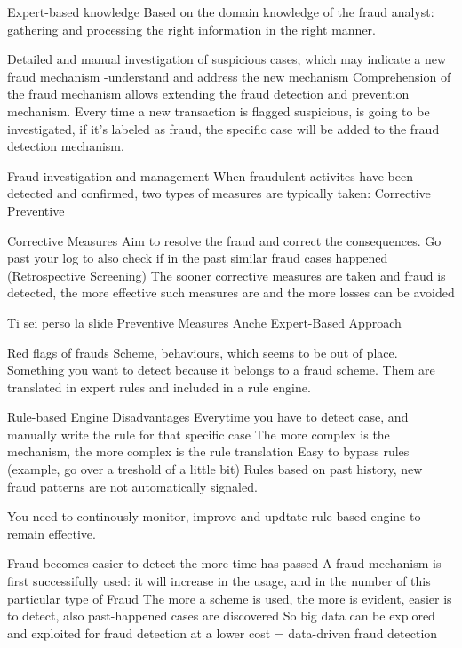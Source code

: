 Expert-based knowledge
    Based on the domain knowledge of the fraud analyst: gathering and processing the right information in the right manner.
    
    Detailed and manual investigation of suspicious cases, which may indicate a new fraud mechanism
        -understand and address the new mechanism 
    Comprehension of the fraud mechanism allows extending the fraud detection and prevention mechanism. Every time a new transaction is flagged suspicious, is going to be investigated, if it's labeled as fraud, the specific case will be added to the fraud detection mechanism.


Fraud investigation and management
    When fraudulent activites have been detected and confirmed, two types of measures are typically taken:
        Corrective 
        Preventive 

    Corrective Measures 
        Aim to resolve the fraud and correct the consequences. Go past your log to also check if in the past similar fraud cases happened (Retrospective Screening)
        The sooner corrective measures are taken and fraud is detected, the more effective such measures are and the more losses can be avoided

    Ti sei perso la slide Preventive Measures 
Anche Expert-Based Approach

Red flags of frauds
        Scheme, behaviours, which seems to be out of place. Something you want to detect because it belongs to a fraud scheme.
        Them are translated in expert rules and included in a rule engine.
    
Rule-based Engine Disadvantages 
        Everytime you have to detect case, and manually write the rule for that specific case
        The more complex is the mechanism, the more complex is the rule translation 
        Easy to bypass rules (example, go over a treshold of a little bit)
        Rules based on past history, new fraud patterns are not automatically signaled.

        You need to continously monitor, improve and updtate rule based engine to remain effective.

Fraud becomes easier to detect the more time has passed
        A fraud mechanism is first successifully used: it will increase in the usage, and in the number of this particular type of Fraud
        The more a scheme is used, the more is evident, easier is to detect, also past-happened cases are discovered
        So big data can be explored and exploited for fraud detection at a lower cost = data-driven fraud detection

